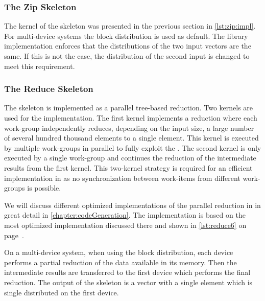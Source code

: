 




\subsubsection{The Zip Skeleton}
The \OpenCL kernel of the \zip skeleton was presented in the previous section in \autoref{lst:zip:impl}.
For multi-device systems the block distribution is used as default.
The \SkelCL library implementation enforces that the distributions of the two input vectors are the same.
If this is not the case, the distribution of the second input is changed to meet this requirement.





\subsubsection{The Reduce Skeleton}
The \reduce skeleton is implemented as a parallel tree-based reduction.
Two \OpenCL kernels are used for the implementation.
The first kernel implements a reduction where each work-group independently reduces, depending on the input size, a large number of several hundred thousand elements to a single element.
This kernel is executed by multiple work-groups in parallel to fully exploit the \GPU.
The second kernel is only executed by a single work-group and continues the reduction of the intermediate results from the first kernel.
This two-kernel strategy is required for an efficient implementation in \OpenCL as no synchronization between work-items from different work-groups is possible.

We will discuss different optimized implementations of the parallel reduction in \OpenCL in great detail in \autoref{chapter:codeGeneration}.
The \SkelCL implementation is based on the most optimized implementation discussed there and shown in \autoref{lst:reduce6} on page~\pageref{lst:reduce6}.

On a multi-device system, when using the block distribution, each device performs a partial reduction of the data available in its memory.
Then the intermediate results are transferred to the first device which performs the final reduction.
The output of the \reduce skeleton is a vector with a single element which is single distributed on the first device.






